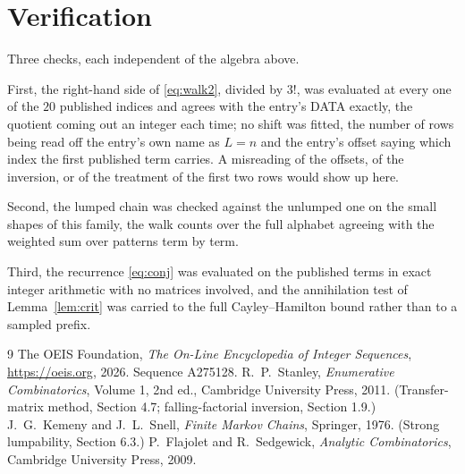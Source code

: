 \documentclass[11pt,a4paper]{article}
\theoremstyle{plain}
\theoremstyle{definition}
\begin{document}
\section{Verification}

Three checks, each independent of the algebra above.

First, the right-hand side of \eqref{eq:walk2}, divided by $3!$, was evaluated at every
one of the $20$ published indices and agrees with the entry's DATA exactly, the quotient
coming out an integer each time; no shift was fitted, the number of rows being read off the
entry's own name as $L=n$ and the entry's offset saying which index the first published
term carries. A misreading of the offsets, of the inversion, or of the treatment of the first
two rows would show up here.

Second, the lumped chain was checked against the unlumped one on the small shapes of this
family, the walk counts over the full alphabet agreeing with the weighted sum over patterns
term by term.

Third, the recurrence \eqref{eq:conj} was evaluated on the published terms in exact integer
arithmetic with no matrices involved, and the annihilation test of Lemma~\ref{lem:crit} was
carried to the full Cayley--Hamilton bound rather than to a sampled prefix.

\begin{thebibliography}{9}
 The OEIS Foundation, \emph{The On-Line Encyclopedia of Integer
Sequences}, \url{https://oeis.org}, 2026. Sequence A275128.
 R.~P.~Stanley, \emph{Enumerative Combinatorics}, Volume 1, 2nd ed.,
Cambridge University Press, 2011. (Transfer-matrix method, Section 4.7; falling-factorial
inversion, Section 1.9.)
 J.~G.~Kemeny and J.~L.~Snell, \emph{Finite Markov Chains}, Springer,
1976. (Strong lumpability, Section 6.3.)
 P.~Flajolet and R.~Sedgewick, \emph{Analytic Combinatorics}, Cambridge
University Press, 2009.
\end{thebibliography}
\end{document}
